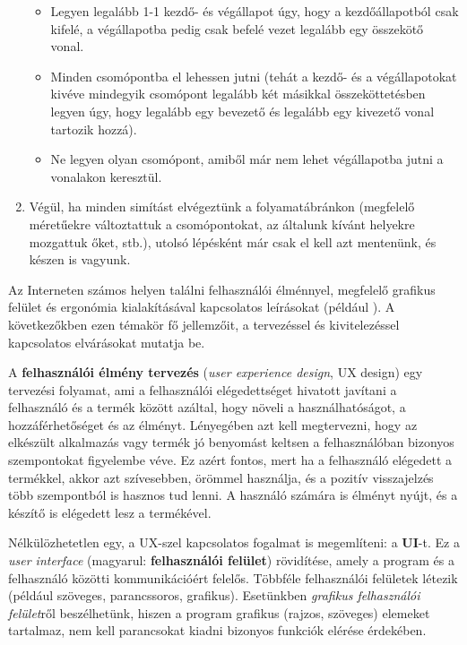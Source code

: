 \begin{enumerate}
\begin{itemize}
\item Legyen legalább 1-1 kezdő- és végállapot úgy, hogy a kezdőállapotból csak kifelé, a végállapotba pedig csak befelé vezet legalább egy összekötő vonal.
\item Minden csomópontba el lehessen jutni (tehát a kezdő- és a végállapotokat kivéve mindegyik csomópont legalább két másikkal összeköttetésben legyen úgy, hogy legalább egy bevezető és legalább egy kivezető vonal tartozik hozzá).
\item Ne legyen olyan csomópont, amiből már nem lehet végállapotba jutni a vonalakon keresztül.
\end{itemize}

\item Végül, ha minden simítást elvégeztünk a folyamatábránkon (megfelelő méretűekre változtattuk a csomópontokat, az általunk kívánt helyekre mozgattuk őket, stb.), utolsó lépésként már csak el kell azt mentenünk, és készen is vagyunk.
\end{enumerate}


Az Interneten számos helyen találni felhasználói élménnyel, megfelelő grafikus felület és ergonómia kialakításával kapcsolatos leírásokat (például \cite{uxblog}). A következőkben ezen témakör fő jellemzőit, a tervezéssel és kivitelezéssel kapcsolatos elvárásokat mutatja be.


A \textbf{felhasználói élmény tervezés} (\textit{user experience design}, UX design) egy tervezési folyamat, ami a felhasználói elégedettséget hivatott javítani a felhasználó és a termék között azáltal, hogy növeli a használhatóságot, a hozzáférhetőséget és az élményt. Lényegében azt kell megtervezni, hogy az elkészült alkalmazás vagy termék jó benyomást keltsen a felhasználóban bizonyos szempontokat figyelembe véve. Ez azért fontos, mert ha a felhasználó elégedett a termékkel, akkor azt szívesebben, örömmel használja, és a pozitív visszajelzés több szempontból is hasznos tud lenni. A használó számára is élményt nyújt, és a készítő is elégedett lesz a termékével.

Nélkülözhetetlen egy, a UX-szel kapcsolatos fogalmat is megemlíteni: a \textbf{UI}-t. Ez a \textit{user interface} (magyarul: \textbf{felhasználói felület}) rövidítése, amely a program és a felhasználó közötti kommunikációért felelős. Többféle felhasználói felületek létezik (például szöveges, parancssoros, grafikus). Esetünkben \textit{grafikus felhasználói felület}ről beszélhetünk, hiszen a program grafikus (rajzos, szöveges) elemeket tartalmaz, nem kell parancsokat kiadni bizonyos funkciók elérése érdekében.

